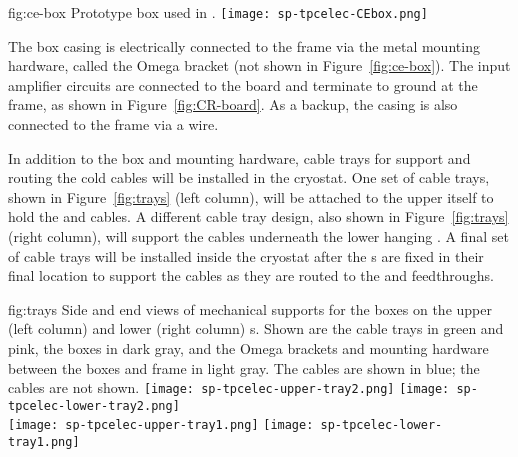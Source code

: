 \begin{dunefigure}
{fig:ce-box}
{Prototype  box used in .}
\texttt{[image: sp-tpcelec-CEbox.png]}
\end{dunefigure}

The  box casing is electrically connected to the 
 frame via the metal mounting hardware, called the 
Omega bracket (not shown in Figure~\ref{fig:ce-box}). The 
input amplifier circuits  are connected to the  board  
and terminate to ground at the  frame, as 
shown in Figure~\ref{fig:CR-board}.  As a backup, the casing is 
also connected to the  frame via a wire.

In addition to the  box and mounting hardware, cable trays 
for support and routing the cold cables will be installed in the 
cryostat. One set of cable trays, shown in Figure~\ref{fig:trays} 
(left column), will be attached to the upper  itself 
to hold the  and  cables. A different cable 
tray design, also shown in Figure~\ref{fig:trays} (right column), 
will support the  cables underneath the 
lower hanging . A final set of cable trays will be 
installed inside the cryostat after the s are 
fixed in their final location to support the cables as they are 
routed to the  and  feedthroughs.

\begin{dunefigure}
{fig:trays}
{Side and end views of mechanical supports for the  
boxes on the upper (left column) and lower (right column) 
s. Shown are the  cable trays in green and pink, 
the  boxes in dark gray, and the Omega brackets and mounting 
hardware between the  boxes and  frame in light gray.  
The  cables are shown in blue; the  cables are not shown.}
\texttt{[image: sp-tpcelec-upper-tray2.png]}
\hspace{5mm}
\texttt{[image: sp-tpcelec-lower-tray2.png]} \\
\texttt{[image: sp-tpcelec-upper-tray1.png]}
\hspace{5mm}
\texttt{[image: sp-tpcelec-lower-tray1.png]}
\end{dunefigure}


